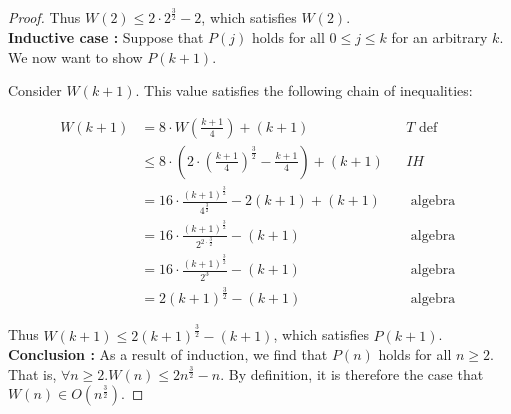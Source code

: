 \documentclass[10pt]{article}
\begin{document}
\begin{enumerate}[label={}]
\begin{proof}
                  Thus $W(2) \leq 2 \cdot 2^{\frac{3}{2}} - 2$, which satisfies $W(2)$.\\

                  \textbf{Inductive case :} Suppose that $P(j)$ holds for all $0 \leq j \leq k$ for an arbitrary $k$. We now want to show $P(k+1)$.

                  Consider $W(k+1)$. This value satisfies the following chain of inequalities:

                  $$
                        \begin{aligned}
                              W(k+1) & =8 \cdot W\left(\frac{k+1}{4}\right)+(k+1)                                                       &  & T \text { def }   \\
                                     & \leq 8 \cdot\left(2 \cdot \left(\frac{k+1}{4}\right)^{\frac{3}{2}} - \frac{k+1}{4}\right) +(k+1) &  & I H               \\
                                     & =16 \cdot \frac{(k+1)^{\frac{3}{2}}}{4^{\frac{3}{2}}}-2(k+1) + (k+1)                             &  & \text { algebra } \\
                                     & =16 \cdot \frac{(k+1)^{\frac{3}{2}}}{2^{2 \cdot \frac{3}{2}}}-(k+1)                              &  & \text { algebra } \\
                                     & =16 \cdot \frac{(k+1)^{\frac{3}{2}}}{2^3}-(k+1)                                                  &  & \text { algebra } \\
                                     & =2(k+1)^{\frac{3}{2}}-(k+1)                                                                      &  & \text { algebra }
                        \end{aligned}
                  $$



                  Thus $W(k+1) \leq 2(k+1)^{\frac{3}{2}}-(k+1)$, which satisfies $P(k+1)$.\\

                  \textbf{Conclusion :} As a result of induction, we find that $P(n)$ holds for all $n \geq 2$. That is, $\forall n \geq 2 . W(n) \leq 2n^{\frac{3}{2}} - n$. By definition, it is therefore the case that $W(n) \in O\left(n^{\frac{3}{2}}\right)$.
            \end{proof}

\end{enumerate}

\newpage
\end{document}

